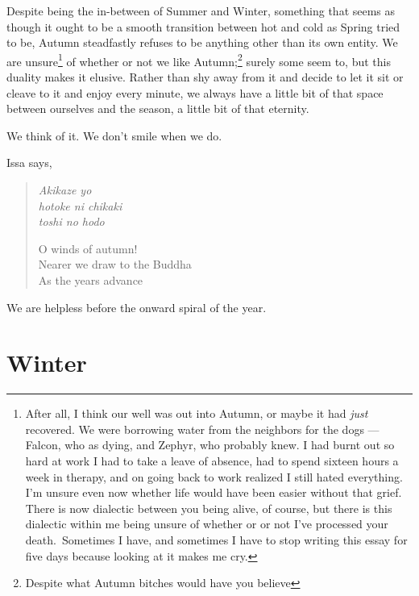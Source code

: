 \documentclass[12pt,oneside]{memoir}
\begin{document}
Despite being the in-between of Summer and Winter, something that seems as though it ought to be a smooth transition between hot and cold as Spring tried to be, Autumn steadfastly refuses to be anything other than its own entity. We are unsure\footnote{After all, I think our well was out into Autumn, or maybe it had \emph{just} recovered. We were borrowing water from the neighbors for the dogs --- Falcon, who as dying, and Zephyr, who probably knew. I had burnt out so hard at work I had to take a leave of absence, had to spend sixteen hours a week in therapy, and on going back to work realized I still hated everything. I'm unsure even now whether life would have been easier without that grief. There is now dialectic between you being alive, of course, but there is this dialectic within me being unsure of whether or or not I've processed your death.\footnotemark\ Sometimes I have, and sometimes I have to stop writing this essay for five days because looking at it makes me cry.} of whether or not we like Autumn;\footnote{Despite what Autumn bitches would have you believe\footnotemark} surely some seem to, but this duality makes it elusive. Rather than shy away from it and decide to let it sit or cleave to it and enjoy every minute, we always have a little bit of that space between ourselves and the season, a little bit of that eternity.

We think of it. We don't smile when we do.

Issa says,

\begin{verse}
\emph{Akikaze yo} \\
\emph{hotoke ni chikaki} \\
\emph{toshi no hodo}

O winds of autumn! \\
Nearer we draw to the Buddha \\
As the years advance

\parencite[11]{issa}
\end{verse}

We are helpless before the onward spiral of the year.


\section*{Winter}
\end{document}
